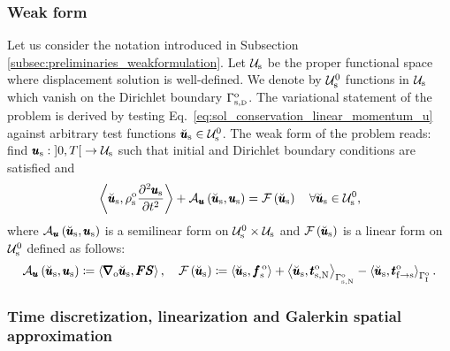 \documentclass[11pt,english]{article}
\def\usolid{\pmb{u}_{\rm{s}}}                   %
\def\usolidspace{\mathcal{U}_{\rm{s}}}          %
\def\testusolid{\breve{\pmb{u}}_{\rm{s}}}       %
\def\testusolidspace{\mathcal{U}_{\rm{s}}^0}    %
\def\u{{\pmb u}}                            %
\def\F{\pmb{F}}                             %
\def\PK{\pmb{S}}                            %
\def\boundarysolidDirichlet{\Gamma_{\rm{s,\scriptscriptstyle \rm{D}}}^{\rm{o}}} %
\def\boundarysolidNeumann{\Gamma_{\rm{s}, \scriptscriptstyle \rm{N}}^{\rm{o}}} %
\def\reftract{\pmb{t}_{\rm{s},\rm{N}}^{\rm{o}}}            %
\def\bodyfsolid{\pmb{f}_{\rm{s}}^{\,\rm{o}}}        %
\def\grad{\pmb{\nabla}_{\rm{o}}}        %
\def\denssolid{\rho_{\rm{s}}^{\rm{o}}}  %
\def\boundaryFSIreference{\Gamma_{\rm{I}}^{\rm{o}}}
\def\FSItract{\pmb{t}_{\rm{f}\to{\rm{s}}}}
\def\FSItractref{\FSItract^{\rm{o}}}
\def\timeint{\left ] 0,T\right[}                         %
\def\dudt{\frac{\partial \usolid}{\partial t}}          %
\def\dudt2{\frac{\partial^2 \usolid}{\partial t^2}}     %
\begin{document}
\subsubsection{Weak form\label{subsubsec:u_formulation_weakform}}

Let us consider the notation introduced in Subsection \ref{subsec:preliminaries_weakformulation}. Let $\usolidspace$ be the proper functional space where displacement solution is well-defined. We denote by $\testusolidspace$ functions in $\usolidspace$ which vanish on the Dirichlet boundary $\boundarysolidDirichlet$. The variational statement of the problem is derived by testing Eq.~\eqref{eq:sol_conservation_linear_momentum_u} against arbitrary test functions $\testusolid \in \testusolidspace$. The weak form of the problem reads: find $\usolid: \timeint \rightarrow  \usolidspace $ such that initial and Dirichlet boundary conditions are satisfied and
\begin{equation*}
     \left \langle \testusolid, \denssolid \dudt2 \right \rangle + \mathcal{A}_\u \left ( \testusolid, \usolid \right) = \mathcal{F} \left ( \testusolid  \right) \quad \forall \testusolid \in \testusolidspace,
\end{equation*}
where $\mathcal{A}_\u \left ( \testusolid, \usolid \right)$ is a semilinear form on $\testusolidspace \times \usolidspace$ and $\mathcal{F} \left ( \testusolid  \right)$ is a linear form on $\testusolidspace$ defined as follows:
\begin{alignat*}{1}
    \mathcal{A}_\u \left ( \testusolid, \usolid \right)  \coloneqq \left \langle \grad \testusolid,  \F \PK \right \rangle, \quad \mathcal{F} \left ( \testusolid  \right) \coloneqq \left \langle \testusolid, \bodyfsolid \right \rangle + \left \langle \testusolid, \reftract \right \rangle_{\boundarysolidNeumann} - \left \langle \testusolid, \FSItractref \right \rangle_{\boundaryFSIreference}.
\end{alignat*}

\subsubsection{Time discretization, linearization and Galerkin spatial approximation\label{subsubsec:u_formulation_time_space_linearization}}
\end{document}
